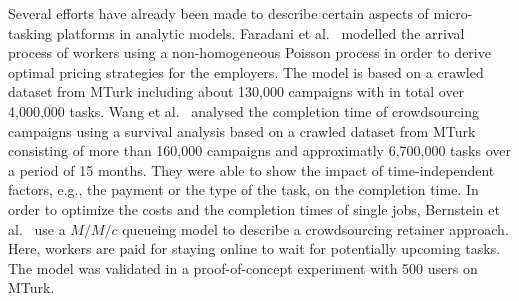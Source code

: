Several efforts have already been made to describe certain aspects of micro-tasking platforms in analytic models. 
Faradani et al.~\cite{Faradani2011} modelled the arrival process of workers using a non-homogeneous Poisson process in order to derive optimal pricing strategies for the employers.
The model is based on a crawled dataset from MTurk including about 130,000 campaigns with in total over 4,000,000 tasks.
Wang et al.~\cite{Wang2011} analysed the completion time of crowdsourcing campaigns using a survival analysis based on a crawled dataset from MTurk consisting of more than 160,000 campaigns and approximatly 6,700,000 tasks over a period of 15 months.
They were able to show the impact of time-independent factors, e.g., the payment or the type of the task, on the completion time.
In order to optimize the costs and the completion times of single jobs, Bernstein et al.~\cite{Bernstein2012} use a \(M/M/c\) queueing model to describe a crowdsourcing retainer approach.
Here, workers are paid for staying online to wait for potentially upcoming tasks.
The model was validated in a proof-of-concept experiment with 500 users on MTurk.
